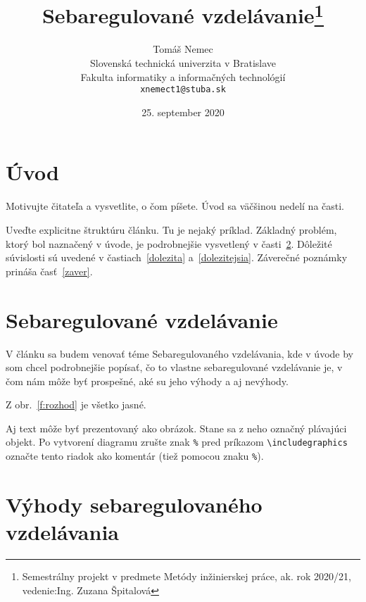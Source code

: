 \documentclass[10pt,twoside,slovak,a4paper]{article} %
\title{Sebaregulované vzdelávanie\thanks{Semestrálny projekt v predmete Metódy inžinierskej práce, ak. rok 2020/21, vedenie:Ing. Zuzana Špitalová}} %
\author{Tomáš Nemec\\[2pt]
	{\small Slovenská technická univerzita v Bratislave}\\
	{\small Fakulta informatiky a informačných technológií}\\
	{\small \texttt{xnemect1@stuba.sk}}
	}
\date{\small 25. september 2020} %
\begin{document}
\maketitle

\begin{abstract}
\end{abstract}



\section{Úvod}

Motivujte čitateľa a vysvetlite, o čom píšete. Úvod sa väčšinou nedelí na časti.

Uveďte explicitne štruktúru článku. Tu je nejaký príklad.
Základný problém,\cite{Kang:FODA} ktorý bol naznačený v úvode, je podrobnejšie vysvetlený v časti~\ref{nejaka}.
Dôležité súvislosti sú uvedené v častiach~\ref{dolezita} a~\ref{dolezitejsia}.
Záverečné poznámky prináša časť~\ref{zaver}.



\section{Sebaregulované vzdelávanie} \label{nejaka}

V článku sa budem venovať téme Sebaregulovaného vzdelávania, kde v úvode
by som chcel podrobnejšie popísať, čo to vlastne sebaregulované vzdelávanie
je, v čom nám môže byť prospešné, aké su jeho výhody a aj nevýhody.




Z obr.~\ref{f:rozhod} je všetko jasné. 

\begin{figure*}[tbh]
\centering
Aj text môže byť prezentovaný ako obrázok. Stane sa z neho označný plávajúci objekt. Po vytvorení diagramu zrušte znak \texttt{\%} pred príkazom \verb|\includegraphics| označte tento riadok ako komentár (tiež pomocou znaku \texttt{\%}).
\caption{Rozhodujúci argument.}
\label{f:rozhod}
\end{figure*}



\section{Výhody sebaregulovaného vzdelávania} \label{ina}
\end{document}
